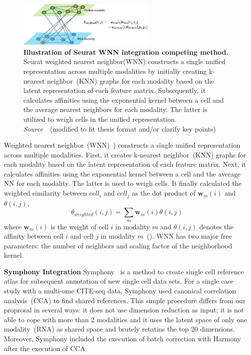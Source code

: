 \begin{description}
\begin{figure}[!h]
  	\centering
  	\includegraphics[width=0.60\textwidth]{Alg_WNN/fig}
  	\vspace{0.1cm}
  	\caption[Illustration of Seurat WNN integration competing method.]{\textbf{Illustration of Seurat WNN integration competing method.} Seurat weighted nearest neighbor(WNN) constructs a single unified representation across multiple modalities by initially creating k-nearest neighbor~(KNN) graphs for each modality based on the latent representation of each feature matrix. Subsequently, it calculates affinities using the exponential kernel between a cell and the average nearest neighbors for each modality. The latter is utilized to weigh cells in the unified representation. \emph{Source~\cite{hao2021seurat4}}~(modified to fit thesis format and/or clarify key points)
  }
  	\label{fig:Alg_WNN}
\end{figure}

  \item[Seurat WNN]
  Weighted nearest neighbor~(WNN)~\citep{hao2021seurat4}) constructs a single unified representation across multiple modalities. First, it creates k-nearest neighbor~(KNN) graphs for each modality based on the latent representation of each feature matrix. Next, it calculates affinities using the exponential kernel between a cell and the average NN for each modality. The latter is used to weigh cells. It finally calculated the weighted similarity between $cell_i$ and $cell_j$ as the dot product of $\textbf{w}_m(i)$ and $\theta(i,j)$,
  \begin{equation}
  	\theta_{weighted}(i,j)=\sum_{m} \textbf{w}_m(i)\theta(i,j)
  \end{equation}
  where $\textbf{w}_m(i)$ is the weight of cell $i$ in modality $m$ and $\theta(i,j)$ denotes the affinity between cell $i$ and cell $j$ in modality $m$~(). WNN has two major free parameters: the number of neighbors and scaling factor of the neighborhood kernel.


  \item \textbf{Symphony Integration}
  Symphony~\citep{kang2021symphony} is a method to create single cell reference atlas for subsequent annotation of new single cell data sets. For a single case study with a multi-ome CITE-seq data, Symphony used canonical correlation analysis~(CCA) to find shared references. This simple procedure differs from our proprosal in several ways: it does not use dimension reduction as input; it is not able to cope with more than 2 modalities and it uses the latent space of only one modality~(RNA) as shared space and brutely retatins the top 20 dimensions. Moreover, Symphony included the execution of batch correction with Harmony after the execution of CCA.
\end{description}


